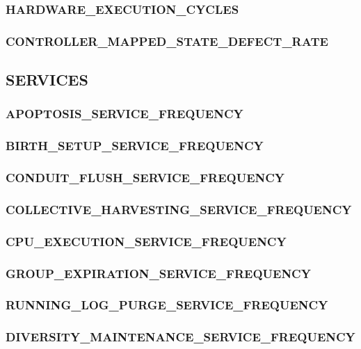 \subsubsection{HARDWARE\_EXECUTION\_CYCLES}

\subsubsection{CONTROLLER\_MAPPED\_STATE\_DEFECT\_RATE}

\subsection{SERVICES}

\subsubsection{APOPTOSIS\_SERVICE\_FREQUENCY}

\subsubsection{BIRTH\_SETUP\_SERVICE\_FREQUENCY}

\subsubsection{CONDUIT\_FLUSH\_SERVICE\_FREQUENCY}

\subsubsection{COLLECTIVE\_HARVESTING\_SERVICE\_FREQUENCY}

\subsubsection{CPU\_EXECUTION\_SERVICE\_FREQUENCY}

\subsubsection{GROUP\_EXPIRATION\_SERVICE\_FREQUENCY}

\subsubsection{RUNNING\_LOG\_PURGE\_SERVICE\_FREQUENCY}

\subsubsection{DIVERSITY\_MAINTENANCE\_SERVICE\_FREQUENCY}

